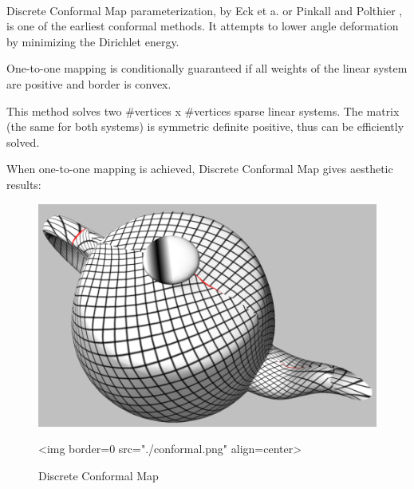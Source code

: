   \\

Discrete Conformal Map parameterization, by Eck et a. or Pinkall and Polthier
\cite{cgal:fh-survey-05}, is one of the earliest conformal methods. It attempts
to lower angle deformation by minimizing the Dirichlet energy.

One-to-one mapping is conditionally guaranteed if all weights
of the linear system are positive and border is convex.

This method solves two \#vertices x \#vertices sparse linear systems. The matrix
(the same for both systems) is symmetric definite positive, thus can be
efficiently solved.

When one-to-one mapping is achieved, Discrete Conformal Map gives aesthetic results:

\begin{figure}[bht]
    \begin{center}
        \begin{ccTexOnly}
            \includegraphics{Parameterization/conformal} %
        \end{ccTexOnly}
        \begin{ccHtmlOnly}
            <img border=0 src="./conformal.png" align=center>
        \end{ccHtmlOnly}
        \label{parameterization-fig-conformal}

        \caption{Discrete Conformal Map}
    \end{center}
\end{figure}


